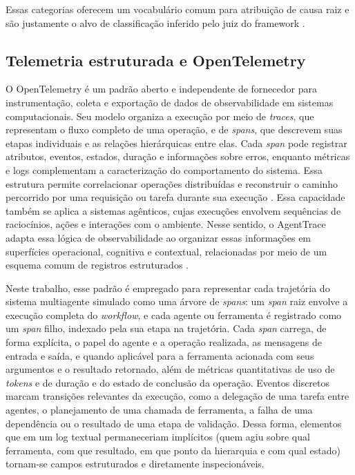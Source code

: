\documentclass[sigconf]{acmart}
\begin{document}
Essas categorias oferecem um vocabulário comum para atribuição de causa raiz e são justamente o alvo de classificação
inferido pelo juiz do framework \cite{barke2026agentrx}.

\subsection{Telemetria estruturada e OpenTelemetry}

O OpenTelemetry é um padrão aberto e independente de fornecedor para instrumentação, coleta e exportação de dados de
observabilidade em sistemas computacionais. Seu modelo organiza a execução por meio de \textit{traces}, que representam
o fluxo completo de uma operação, e de \textit{spans}, que descrevem suas etapas individuais e as relações hierárquicas
entre elas. Cada \textit{span} pode registrar atributos, eventos, estados, duração e informações sobre erros, enquanto
métricas e logs complementam a caracterização do comportamento do sistema. Essa estrutura permite correlacionar
operações distribuídas e reconstruir o caminho percorrido por uma requisição ou tarefa durante sua execução
\cite{ibm_opentelemetry, dong2024agentops}. Essa capacidade também se aplica a sistemas agênticos, cujas execuções
envolvem sequências de raciocínios, ações e interações com o ambiente. Nesse sentido, o AgentTrace adapta essa lógica
de observabilidade ao organizar essas informações em superfícies operacional, cognitiva e contextual, relacionadas por
meio de um esquema comum de registros estruturados \cite{alsayyad2026agenttrace}.

Neste trabalho, esse padrão é empregado para representar cada trajetória do sistema multiagente simulado como uma
árvore de \textit{spans}: um \textit{span} raiz envolve a execução completa do \textit{workflow}, e cada agente ou
ferramenta é registrado como um \textit{span} filho, indexado pela sua etapa na trajetória. Cada \textit{span} carrega,
de forma explícita, o papel do agente e a operação realizada, as mensagens de entrada e saída, e quando aplicável para
a ferramenta acionada com seus argumentos e o resultado retornado, além de métricas quantitativas de uso de
\textit{tokens} e de duração e do estado de conclusão da operação. Eventos discretos marcam transições relevantes da
execução, como a delegação de uma tarefa entre agentes, o planejamento de uma chamada de ferramenta, a falha de uma
dependência ou o resultado de uma etapa de validação. Dessa forma, elementos que em um log textual permaneceriam
implícitos (quem agiu sobre qual ferramenta, com que resultado, em que ponto da hierarquia e com qual estado) tornam-se
campos estruturados e diretamente inspecionáveis.
\end{document}
